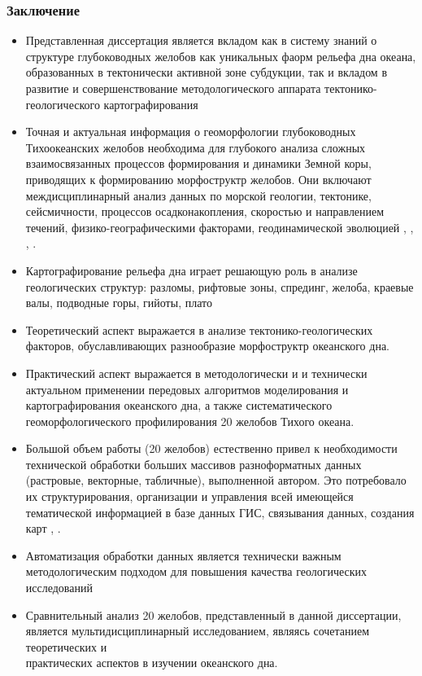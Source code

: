 \documentclass[pdflatex,compress,8pt,
	xcolor={dvipsnames,dvipsnames,svgnames,x11names,table},
	hyperref={colorlinks = true,breaklinks = true, urlcolor = NavyBlue}]{beamer}
\begin{document}
\begin{frame}\frametitle{Заключение}

\begin{itemize}\small
	\item Представленная диссертация является вкладом как в систему знаний о структуре глубоководных желобов как уникальных фаорм рельефа дна океана, образованных в тектонически активной зоне субдукции, так и вкладом в развитие и совершенствование методологического аппарата тектонико-геологического картографирования
	\item Точная и актуальная информация о геоморфологии глубоководных Тихоокеанских желобов необходима для глубокого анализа сложных взаимосвязанных процессов формирования и динамики Земной коры, приводящих к формированию морфоструктр желобов. Они включают междисциплинарный  анализ данных по морской геологии, тектонике, сейсмичности, процессов осадконакопления, скоростью и направлением течений, физико-географическими факторами, геодинамической эволюцией \cite{Lemenkova2006e}, \cite{Lemenkova2006a}, \cite{Lemenkova2006b}, \cite{Lemenkova2006c}.
	\item Картографирование рельефа дна играет решающую роль в анализе геологических структур: разломы, рифтовые зоны, спрединг, желоба, краевые валы, подводные горы, гийоты, плато
	\item Теоретический аспект выражается в анализе тектонико-геологических факторов, обуславливающих разнообразие морфоструктр океанского дна. 
	\item Практический аспект выражается в методологически и и технически актуальном применении передовых алгоритмов моделирования и картографирования океанского дна, а также систематического геоморфологического профилирования 20 желобов Тихого океана.	
	\item Большой объем работы (20 желобов) естественно привел к необходимости технической обработки больших массивов разноформатных данных (растровые, векторные, табличные), выполненной автором. Это потребовало их структурирования, организации и управления всей имеющейся тематической информацией в базе данных ГИС, связывания данных, создания карт \cite{Lemenkova201540}, \cite{Lemenkova2016e}. 
	\item Автоматизация обработки данных является технически важным методологическим подходом для повышения качества геологических исследований
	\item Сравнительный анализ  20 желобов, представленный в данной диссертации, является мультидисциплинарный исследованием, являясь сочетанием теоретических и \\практических аспектов в изучении океанского дна. 

\end{itemize}

\end{frame}
\end{document}
